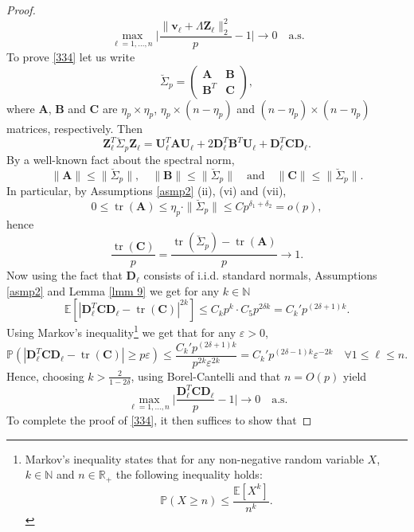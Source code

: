 \documentclass[a4paper,11pt]{book}
\theoremstyle{plain}
\theoremstyle{definition}
\newcommand{\ME}{\mathbb{E}}
\newcommand{\MR}{\mathbb{R}}
\newcommand{\MP}{\mathbb{P}}
\newcommand{\MN}{\mathbb{N}}
\newcommand{\tr}{\operatorname{tr}}
\begin{document}
\begin{proof}
    	\begin{equation} \label{335}
    		\max_{\ell = 1, \dots, n} \Bigg|\frac{  \| \mathbf{v}_\ell + \Lambda\mathbf{Z}_\ell  \|_2^2}{p} - 1\Bigg| \rightarrow 0 \quad \text{a.s.}
    	\end{equation}
    	To prove \eqref{334} let us write
    	\[ \breve{\Sigma}_p = \begin{pmatrix}
    	\mathbf{A} & \mathbf{B} \\
    	\mathbf{B}^T & \mathbf{C}
    	\end{pmatrix}, \]
    	where $\mathbf{A}$, $\mathbf{B}$ and $\mathbf{C}$ are $\eta_p \times \eta_p$, $\eta_p \times (n - \eta_p)$ and $(n-\eta_p) \times (n-\eta_p)$ matrices, respectively. Then
    	\[ \mathbf{Z}_\ell^T \breve{\Sigma}_p \mathbf{Z}_\ell = \mathbf{U}_\ell^T \mathbf{A} \mathbf{U}_\ell + 2\mathbf{D}_\ell^T \mathbf{B}^T \mathbf{U}_\ell + \mathbf{D}_\ell^T \mathbf{C} \mathbf{D}_\ell.  \]    	
    	By a well-known fact about the spectral norm,
    	\[ \|\mathbf{A}\| \leq \|\breve{\Sigma}_p \|, \quad \|\mathbf{B}\| \leq \|\breve{\Sigma}_p \| \quad \text{and} \quad \|\mathbf{C}\| \leq \|\breve{\Sigma}_p \|. \]
    	In particular, by Assumptions \ref{asmp2} (ii), (vi) and (vii),
    	\[ 0 \leq \tr(\mathbf{A}) \leq \eta_p \cdot \|\breve{\Sigma}_p \| \leq Cp^{\delta_1 + \delta_2} = o(p), \]
    	hence 
    	\[ \frac{\tr(\mathbf{C})}{p} = \frac{\tr(\breve{\Sigma}_p)-\tr(\mathbf{A})}{p} \rightarrow 1. \]
    	Now using the fact that $\mathbf{D}_\ell$ consists of i.i.d. standard normals, Assumptions \ref{asmp2} and Lemma \ref{lmm 9} we get for any $k \in \MN$
    	\[ \ME[ |\mathbf{D}_\ell^T \mathbf{C} \mathbf{D}_\ell - \tr(\mathbf{C})|^{2k}] \leq C_k p^k \cdot C_5 p^{2 \delta k} = C_k' p^{(2\delta+1)k}.  \]
        Using Markov's inequality\footnote{
        	Markov's inequality states that for any non-negative random variable $X$, $k \in \MN$ and $n \in \MR_+$ the following inequality holds:
        	\[ \MP(X \geq n) \leq \frac{\ME[X^k]}{n^k}. \]
        } we get that for any $\varepsilon > 0$,
        \[ \MP(|\mathbf{D}_\ell^T \mathbf{C} \mathbf{D}_\ell - \tr(\mathbf{C})| \geq p\varepsilon ) \leq \frac{C_k' p^{(2\delta+1)k}}{p^{2k}\varepsilon^{2k}} = C_k' p^{(2\delta-1)k}\varepsilon^{-2k} \quad \forall 1 \leq \ell \leq n. \]
        Hence, choosing $k > \frac{2}{1-2\delta}$, using Borel-Cantelli and that $n = O(p)$ yield
    	\[ \max_{\ell = 1, \dots, n} \Bigg| \frac{\mathbf{D}_\ell^T \mathbf{C} \mathbf{D}_\ell}{p} - 1 \Bigg| \rightarrow 0 \quad \text{a.s.} \]
    	To complete the proof of \eqref{334}, it then suffices to show that

\end{proof}
\end{document}
